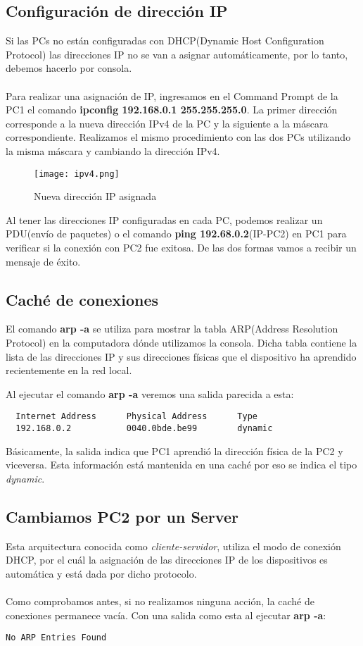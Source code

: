 \documentclass{article}
\begin{document}
\subsection{Configuración de dirección IP}
Si las PCs no están configuradas con DHCP(Dynamic Host Configuration Protocol) las direcciones IP no se van a asignar automáticamente, por lo tanto, debemos hacerlo por consola.
\\\\
Para realizar una asignación de IP, ingresamos en el Command Prompt de la PC1 el comando \textbf{ipconfig 192.168.0.1 255.255.255.0}. La primer dirección corresponde a la nueva dirección IPv4 de la PC y la siguiente a la máscara correspondiente. Realizamos el mismo procedimiento con las dos PCs utilizando la misma máscara y cambiando la dirección IPv4.

\begin{figure}[H]
\centering
\texttt{[image: ipv4.png]}
\caption{\label{fig:ipconfig-all} Nueva dirección IP asignada}
\end{figure}

Al tener las direcciones IP configuradas en cada PC, podemos realizar un PDU(envío de paquetes) o el comando \textbf{ping 192.68.0.2}(IP-PC2) en PC1 para verificar si la conexión con PC2 fue exitosa. De las dos formas vamos a recibir un mensaje de éxito.

\subsection{Caché de conexiones}
El comando \textbf{arp -a} se utiliza para mostrar la tabla ARP(Address Resolution Protocol) en la computadora dónde utilizamos la consola.
Dicha tabla contiene la lista de las direcciones IP y sus direcciones físicas que el dispositivo ha aprendido recientemente en la red local.

Al ejecutar el comando \textbf{arp -a} veremos una salida parecida a esta:
\begin{lstlisting}
  Internet Address      Physical Address      Type
  192.168.0.2           0040.0bde.be99        dynamic
\end{lstlisting}
Básicamente, la salida indica que PC1 aprendió la dirección física de la PC2 y viceversa. Esta información está mantenida en una caché por eso se indica el tipo \textit{dynamic}.

\subsection{Cambiamos PC2 por un Server}
Esta arquitectura conocida como \textit{cliente-servidor}, utiliza el modo de conexión DHCP, por el cuál la asignación de las direcciones IP de los dispositivos es automática y está dada por dicho protocolo.
\\\\
Como comprobamos antes, si no realizamos ninguna acción, la caché de conexiones permanece vacía. Con una salida como esta al ejecutar \textbf{arp -a}:
\begin{lstlisting}
No ARP Entries Found
\end{lstlisting}
\end{document}

